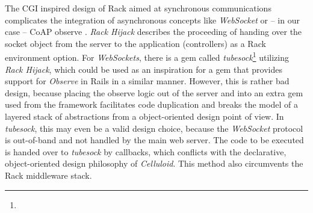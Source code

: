 		The \ac{CGI} inspired design of Rack aimed at synchronous
		communications complicates the integration of asynchronous concepts
		like \emph{WebSocket} or -- in our case -- \ac{CoAP} observe
		\cite{observe}. \emph{Rack Hijack} \cite{rack} describes the proceeding
		of handing over the socket object from the server to the application
		(controllers) as a Rack environment option. For \emph{WebSockets},
		there is a gem called \emph{tubesock}\footnote{\urlTubesock} utilizing
		\emph{Rack Hijack}, which could be used as an inspiration for a gem
		that provides support for \emph{Observe} in \ac{Rails} in a similar
		manner. However, this is rather bad design, because placing the observe
		logic out of the server and into an extra gem used from the framework
		facilitates code duplication and breaks the model of a layered stack of
		abstractions from a object-oriented design point of view. In
		\emph{tubesock}, this may even be a valid design choice, because the
		\emph{WebSocket} protocol \cite{websocket} is out-of-band and not
		handled by the main web server. The code to be executed is handed over
		to \emph{tubesock} by callbacks, which conflicts with the declarative,
		object-oriented design philosophy of \emph{Celluloid}. This method also
		circumvents the Rack middleware stack.

